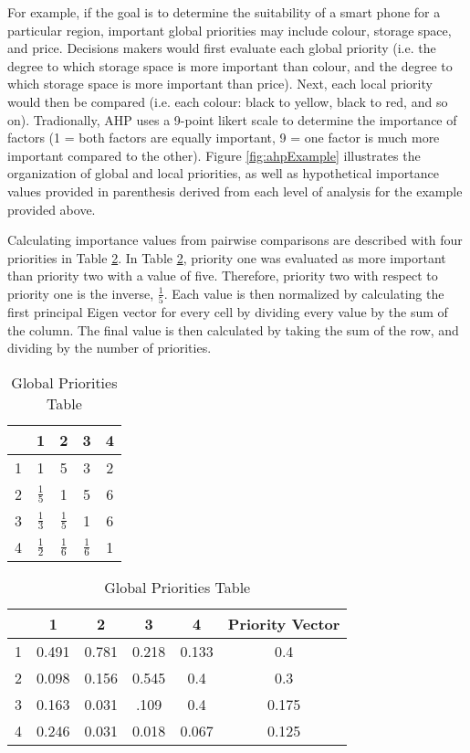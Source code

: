 For example, if the goal is to determine the suitability of a smart phone for a particular region, important global priorities may include colour, storage space, and price. Decisions makers would first evaluate each global priority (i.e. the degree to which storage space is more important than colour, and the degree to which storage space is more important than price). Next, each local priority would then be compared  (i.e. each colour: black to yellow, black to red, and so on). Tradionally, AHP uses a 9-point likert scale to determine the importance of factors (1 = both factors are equally important, 9 = one factor is much more important compared to the other). Figure \ref{fig:ahpExample} illustrates the organization of global and local priorities, as well as hypothetical importance values provided in parenthesis derived from each level of analysis for the example provided above.

Calculating importance values from pairwise comparisons are described with four priorities in Table \ref{tab:priorities}. In Table \ref{tab:priorities}, priority one was evaluated as more important than priority two with a value of five. Therefore, priority two with respect to priority one is the inverse, $\frac{1}{5}$. Each value is then normalized by calculating the first principal Eigen vector for every cell by dividing every value by the sum of the column. The final value is then calculated by taking the sum of the row, and dividing by the number of priorities.

\begin{table}
\begin{minipage}{0.5\linewidth}
\centering
\begin{tabular}{|c|c|c|c|c|}
\hline
& 1 & 2 & 3 & 4 \\
\hline
1 & 1 & 5 & 3 & 2 \\
\hline
2 & $\frac{1}{5}$ & 1 & 5 & 6 \\
\hline
3 & $\frac{1}{3}$ & $\frac{1}{5}$ & 1 & 6 \\
\hline
4 & $\frac{1}{2}$ & $\frac{1}{6}$ & $\frac{1}{6}$ & 1 \\
\hline
\end{tabular}
\caption{Global Comparisons Table \label{tab:global}}
\end{minipage}
\begin{minipage}{0.5\linewidth}
\centering
\begin{tabular}{|c|c|c|c|c||c|}
\hline
& 1 & 2 & 3 & 4 & Priority Vector  \\
\hline
1 & 0.491 & 0.781 & 0.218 & 0.133 & 0.4 \\
\hline
2 & 0.098 & 0.156 & 0.545 & 0.4 & 0.3 \\
\hline
3 & 0.163 & 0.031 & .109 & 0.4 & 0.175 \\
\hline
4 & 0.246 & 0.031 & 0.018 & 0.067 & 0.125 \\
\hline
\end{tabular}
\caption{Global Priorities Table \label{tab:priorities}}
\end{minipage}
\end{table}


